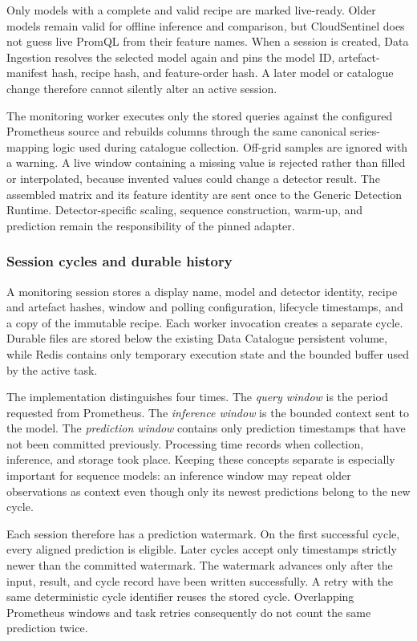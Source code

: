 Only models with a complete and valid recipe are marked live-ready. Older models remain valid for offline inference and comparison, but CloudSentinel does not guess live PromQL from their feature names. When a session is created, Data Ingestion resolves the selected model again and pins the model ID, artefact-manifest hash, recipe hash, and feature-order hash. A later model or catalogue change therefore cannot silently alter an active session.

The monitoring worker executes only the stored queries against the configured Prometheus source and rebuilds columns through the same canonical series-mapping logic used during catalogue collection. Off-grid samples are ignored with a warning. A live window containing a missing value is rejected rather than filled or interpolated, because invented values could change a detector result. The assembled matrix and its feature identity are sent once to the Generic Detection Runtime. Detector-specific scaling, sequence construction, warm-up, and prediction remain the responsibility of the pinned adapter.

\subsubsection{Session cycles and durable history}

A monitoring session stores a display name, model and detector identity, recipe and artefact hashes, window and polling configuration, lifecycle timestamps, and a copy of the immutable recipe. Each worker invocation creates a separate cycle. Durable files are stored below the existing Data Catalogue persistent volume, while Redis contains only temporary execution state and the bounded buffer used by the active task.

The implementation distinguishes four times. The \emph{query window} is the period requested from Prometheus. The \emph{inference window} is the bounded context sent to the model. The \emph{prediction window} contains only prediction timestamps that have not been committed previously. Processing time records when collection, inference, and storage took place. Keeping these concepts separate is especially important for sequence models: an inference window may repeat older observations as context even though only its newest predictions belong to the new cycle.

Each session therefore has a prediction watermark. On the first successful cycle, every aligned prediction is eligible. Later cycles accept only timestamps strictly newer than the committed watermark. The watermark advances only after the input, result, and cycle record have been written successfully. A retry with the same deterministic cycle identifier reuses the stored cycle. Overlapping Prometheus windows and task retries consequently do not count the same prediction twice.

